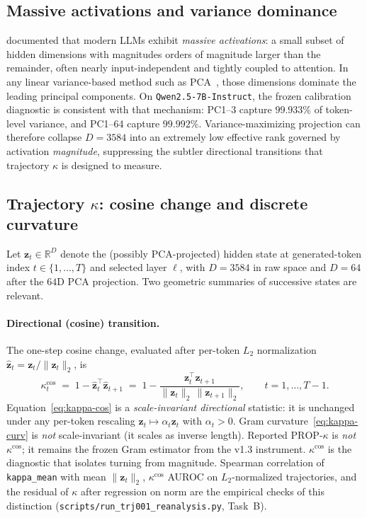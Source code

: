 \documentclass{article}
\newcommand{\propk}{\mathrm{PROP}\text{-}\kappa}
\begin{document}
\subsection{Massive activations and variance dominance}
\label{sec:rw-massive}

\citet{sun2024massive} documented that modern {LLMs} exhibit \emph{massive activations}: a small subset of hidden dimensions with magnitudes orders of magnitude larger than the remainder, often nearly input-independent and tightly coupled to attention.
In any linear variance-based method such as {PCA}~\citep{pearson1901,hotelling1933,jolliffe2002}, those dimensions dominate the leading principal components.
On \texttt{Qwen2.5-7B-Instruct}, the frozen calibration diagnostic is consistent with that mechanism: {PC1}--{3} capture $99.933\%$ of token-level variance, and {PC1}--{64} capture $99.992\%$.
Variance-maximizing projection can therefore collapse $D=3584$ into an extremely low effective rank governed by activation \emph{magnitude}, suppressing the subtler directional transitions that trajectory $\kappa$ is designed to measure.

\subsection{Trajectory $\kappa$: cosine change and discrete curvature}
\label{sec:kappa}

Let $\mathbf{z}_t \in \mathbb{R}^{D}$ denote the (possibly {PCA}-projected) hidden state at generated-token index $t\in\{1,\ldots,T\}$ and selected layer $\ell$, with $D=3584$ in raw space and $D=64$ after the $64${D} {PCA} projection.
Two geometric summaries of successive states are relevant.

\paragraph{Directional (cosine) transition.}
The one-step cosine change, evaluated after per-token $L_2$ normalization $\hat{\mathbf{z}}_t=\mathbf{z}_t/\lVert\mathbf{z}_t\rVert_2$, is
\begin{equation}
  \kappa^{\mathrm{cos}}_{t}
  \;=\;
  1
  -
  \hat{\mathbf{z}}_t^{\top}\hat{\mathbf{z}}_{t+1}
  \;=\;
  1
  -
  \frac{\mathbf{z}_t^{\top}\mathbf{z}_{t+1}}
       {\lVert\mathbf{z}_t\rVert_2\,\lVert\mathbf{z}_{t+1}\rVert_2},
  \qquad t=1,\ldots,T-1.
\label{eq:kappa-cos}
\end{equation}
Equation~\eqref{eq:kappa-cos} is a \emph{scale-invariant directional} statistic: it is unchanged under any per-token rescaling $\mathbf{z}_t\mapsto \alpha_t\mathbf{z}_t$ with $\alpha_t>0$. Gram curvature~\eqref{eq:kappa-curv} is \emph{not} scale-invariant (it scales as inverse length). Reported $\propk$ is \emph{not} $\kappa^{\mathrm{cos}}$; it remains the frozen Gram estimator from the v1.3 instrument. $\kappa^{\mathrm{cos}}$ is the diagnostic that isolates turning from magnitude. Spearman correlation of \texttt{kappa\_mean} with mean $\lVert\mathbf{z}_t\rVert_2$, $\kappa^{\mathrm{cos}}$ {AUROC} on $L_2$-normalized trajectories, and the residual of $\kappa$ after regression on norm are the empirical checks of this distinction (\texttt{scripts/run\_trj001\_reanalysis.py}, Task~B).
\end{document}
